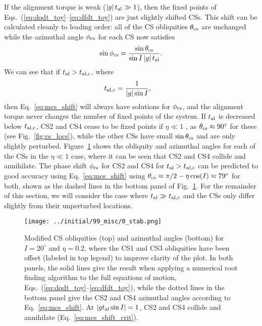 \documentclass[
        fleqn,
        usenatbib,
    ]{mnras}
\newcommand*{\abs}[1]{\left|#1\right|}
\begin{document}
If the alignment torque is weak ($\abs{g}t_{\rm al} \gg 1$), then the fixed
points of Eqs.~(\ref{eq:dqdt_toy}--\ref{eq:dfdt_toy}) are just slightly shifted
CSs. This shift can be calculated cleanly to leading order: all of the CS
obliquities $\theta_{\rm cs}$ are unchanged while the azimuthal angle $\phi_{\rm
cs}$ for each CS now satisfies
\begin{equation}
    \sin \phi_{\rm cs} = \frac{\sin\theta_{\rm cs}}{\sin I \abs{g}t_{\rm al}}.
        \label{eq:mcs_shift}
\end{equation}
We can see that if $t_{\rm al} > t_{\rm al, c}$, where
\begin{align}
    t_{\rm al, c} &= \frac{1}{\abs{g}\sin I},\label{eq:mcs_shift_crit}
\end{align}
then Eq.~\eqref{eq:mcs_shift} will always have solutions for $\phi_{\rm cs}$,
and the alignment torque never changes the number of fixed points of the system.
If $t_{\rm al}$ is decreased below $t_{\rm al, c}$, CS2 and CS4 cease to be
fixed points if $\eta \ll 1$ \citep[as first noted in][]{fabrycky_otides}, as
$\theta_{\rm cs} \approx 90^\circ$ for these (see Fig.~\ref{fig:cs_locs}), while
the other CSs have small $\sin \theta_{\rm cs}$ and are only slightly perturbed.
Figure~\ref{fig:mcs} shows the obliquity and azimuthal angles for each of the
CSs in the $\eta \ll 1$ case, where it can be seen that CS2 and CS4 collide and
annihilate. The phase shift $\phi_{\rm cs}$ for CS2 and CS4 for $t_{\rm al} >
t_{\rm al, c}$ can be predicted to good accuracy using Eq.~\eqref{eq:mcs_shift}
using $\theta_{\rm cs} \approx \pi/2 - \eta \cos (I) \approx 79^\circ$
\citep{su2020} for both, shown as the dashed lines in the bottom panel of
Fig.~\ref{fig:mcs}. For the remainder of this section, we will consider the case
where $t_{\rm al} \gg t_{\rm al, c}$ and the CSs only differ slightly from their
unperturbed locations.
\begin{figure}
    \centering
    \texttt{[image: ../initial/99\_misc/0\_stab.png]}
    \caption{Modified CS obliquities (top) and azimuthal angles (bottom) for $I
    = 20^\circ$ and $\eta = 0.2$, where the CS1 and CS3 obliquities have been
    offset (labeled in top legend) to improve clarity of the plot. In both
    panels, the solid lines give the result when applying a numerical root
    finding algorithm to the full equations of motion,
    Eqs.~(\ref{eq:dqdt_toy}--\ref{eq:dfdt_toy}), while the dotted lines in the
    bottom panel give the CS2 and CS4 azimuthal angles according to
    Eq.~\eqref{eq:mcs_shift}. At $\abs{gt_{\rm al} \sin I} = 1$, CS2 and CS4
    collide and annihilate (Eq.~\ref{eq:mcs_shift_crit}).}\label{fig:mcs}
\end{figure}
\end{document}
